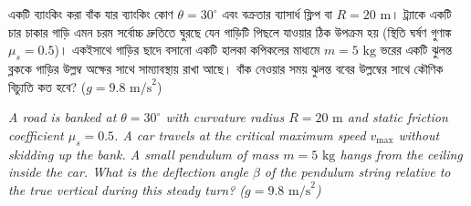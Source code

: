 \documentclass[12pt, a4paper]{article}
\begin{document}
\newpage

\begin{tcolorbox}[questionbox={প্রশ্ন (Question) 24}]
    \noindent
    একটি ব্যাংকিং করা বাঁক যার ব্যাংকিং কোণ $\theta = 30^\circ$ এবং বক্রতার ব্যাসার্ধ ফ্লিপ বা $R = 20\text{ m}$। ট্র্যাকে একটি চার চাকার গাড়ি এমন চরম সর্বোচ্চ দ্রুতিতে ঘুরছে যেন গাড়িটি পিছলে যাওয়ার ঠিক উপক্রম হয় (স্থিতি ঘর্ষণ গুণাঙ্ক $\mu_s = 0.5$)। একইসাথে গাড়ির ছাদে বসানো একটি হালকা কপিকলের মাধ্যমে $m = 5\text{ kg}$ ভরের একটি ঝুলন্ত ব্লককে গাড়ির উল্লম্ব অক্ষের সাথে সাম্যাবস্থায় রাখা আছে। বাঁক নেওয়ার সময় ঝুলন্ত ববের উল্লম্বের সাথে কৌণিক বিচ্যুতি কত হবে? ($g = 9.8\text{ m/s}^2$)
    
    \vspace{0.8em}
    \begin{english}
    \noindent\textit{\color{darkgray}
    A road is banked at $\theta = 30^\circ$ with curvature radius $R = 20\text{ m}$ and static friction coefficient $\mu_s = 0.5$. A car travels at the critical maximum speed $v_{\max}$ without skidding up the bank. A small pendulum of mass $m = 5\text{ kg}$ hangs from the ceiling inside the car. What is the deflection angle $\beta$ of the pendulum string relative to the true vertical during this steady turn? ($g = 9.8\text{ m/s}^2$)
    }
    \end{english}
\end{tcolorbox}

\vspace{1em}
\begin{center}
\end{center}
\vspace{1em}
\end{document}
